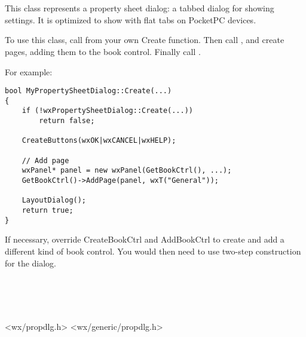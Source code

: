 \section{}\label{wxpropertysheetdialog}

This class represents a property sheet dialog: a tabbed dialog
for showing settings. It is optimized to show with flat tabs
on PocketPC devices.

To use this class, call  from your own
Create function. Then call , and create pages, adding them to the book control.
Finally call .

For example:

\begin{verbatim}
bool MyPropertySheetDialog::Create(...)
{
    if (!wxPropertySheetDialog::Create(...))
        return false;

    CreateButtons(wxOK|wxCANCEL|wxHELP);

    // Add page
    wxPanel* panel = new wxPanel(GetBookCtrl(), ...);
    GetBookCtrl()->AddPage(panel, wxT("General"));

    LayoutDialog();
    return true;
}
\end{verbatim}

If necessary, override CreateBookCtrl and AddBookCtrl to create and add a different
kind of book control. You would then need to use two-step construction for the dialog.


\\
\\
\\


<wx/propdlg.h>
<wx/generic/propdlg.h>


\label{wxpropertysheetdialogctor}


